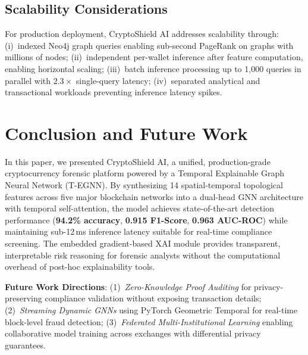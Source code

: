 \documentclass[conference]{IEEEtran}
\begin{document}
\subsection{Scalability Considerations}
For production deployment, CryptoShield AI addresses scalability through: (i)~indexed Neo4j graph queries enabling sub-second PageRank on graphs with millions of nodes; (ii)~independent per-wallet inference after feature computation, enabling horizontal scaling; (iii)~batch inference processing up to 1,000 queries in parallel with $2.3\times$ single-query latency; (iv)~separated analytical and transactional workloads preventing inference latency spikes.

\section{Conclusion and Future Work}
\label{sec:conclusion}

In this paper, we presented CryptoShield AI, a unified, production-grade cryptocurrency forensic platform powered by a Temporal Explainable Graph Neural Network (T-EGNN). By synthesizing 14 spatial-temporal topological features across five major blockchain networks into a dual-head GNN architecture with temporal self-attention, the model achieves state-of-the-art detection performance (\textbf{94.2\% accuracy}, \textbf{0.915 F1-Score}, \textbf{0.963 AUC-ROC}) while maintaining sub-12\,ms inference latency suitable for real-time compliance screening. The embedded gradient-based XAI module provides transparent, interpretable risk reasoning for forensic analysts without the computational overhead of post-hoc explainability tools.

\textbf{Future Work Directions}: (1)~\textit{Zero-Knowledge Proof Auditing} for privacy-preserving compliance validation without exposing transaction details; (2)~\textit{Streaming Dynamic GNNs} using PyTorch Geometric Temporal for real-time block-level fraud detection; (3)~\textit{Federated Multi-Institutional Learning} enabling collaborative model training across exchanges with differential privacy guarantees.
\end{document}
